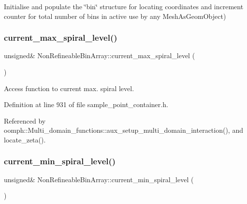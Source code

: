 Initialise and populate the \char`\"{}bin\char`\"{} structure for locating coordinates and increment counter for total number of bins in active use by any Mesh\+As\+Geom\+Object) \mbox{\label{classNonRefineableBinArray_ac3f611d0535d74a65834b4ec9c81a8ca}} 
\subsubsection{\texorpdfstring{current\+\_\+max\+\_\+spiral\+\_\+level()}{current\_max\_spiral\_level()}}
{\footnotesize\ttfamily unsigned\& Non\+Refineable\+Bin\+Array\+::current\+\_\+max\+\_\+spiral\+\_\+level (\begin{DoxyParamCaption}{ }\end{DoxyParamCaption})\hspace{0.3cm}{\ttfamily [inline]}}



Access function to current max. spiral level. 



Definition at line 931 of file sample\+\_\+point\+\_\+container.\+h.



Referenced by oomph\+::\+Multi\+\_\+domain\+\_\+functions\+::aux\+\_\+setup\+\_\+multi\+\_\+domain\+\_\+interaction(), and locate\+\_\+zeta().

\mbox{\label{classNonRefineableBinArray_ae014f4db4cfc34a36e913a91a44ea66a}} 
\subsubsection{\texorpdfstring{current\+\_\+min\+\_\+spiral\+\_\+level()}{current\_min\_spiral\_level()}}
{\footnotesize\ttfamily unsigned\& Non\+Refineable\+Bin\+Array\+::current\+\_\+min\+\_\+spiral\+\_\+level (\begin{DoxyParamCaption}{ }\end{DoxyParamCaption})\hspace{0.3cm}{\ttfamily [inline]}}



